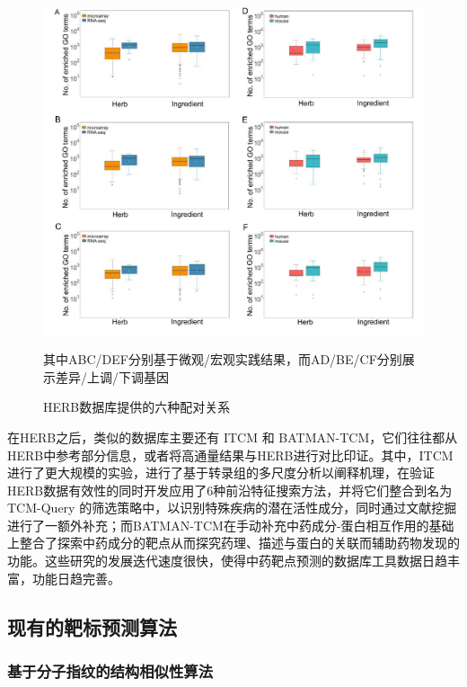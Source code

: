 \begin{figure}[H]
  \centering
  \includegraphics[width=\linewidth]{figures/HERB.png}
  \caption{HERB数据库提供的六种配对关系\cite{Fang_Dong_Liu_Guo_Zhao_Zhang_Bu_Liu_Huo_Cao_et_al._2021}}
  其中ABC/DEF分别基于微观/宏观实践结果，而AD/BE/CF分别展示差异/上调/下调基因
  \label{fig:HERB}
\end{figure}

在HERB之后，类似的数据库主要还有 ITCM 和 BATMAN-TCM，它们往往都从HERB中参考部分信息，或者将高通量结果与HERB进行对比印证。其中，ITCM进行了更大规模的实验，进行了基于转录组的多尺度分析以阐释机理，在验证HERB数据有效性的同时开发应用了6种前沿特征搜索方法，并将它们整合到名为 TCM-Query 的筛选策略中，以识别特殊疾病的潜在活性成分，同时通过文献挖掘进行了一额外补充\cite{Tian_Zhang_Yuan_Wang_Lv_Wang_Fang_Fu_Yang_Zu_et_al._2023}；而BATMAN-TCM在手动补充中药成分-蛋白相互作用的基础上整合了探索中药成分的靶点从而探究药理、描述与蛋白的关联而辅助药物发现的功能\cite{Kong_Liu_Zhang_Cheng_Mei_Li_Liu_Diao_Ma_Jiang_et_al._2024}。这些研究的发展迭代速度很快，使得中药靶点预测的数据库工具数据日趋丰富，功能日趋完善。

\subsection{现有的靶标预测算法}

\subsubsection{基于分子指纹的结构相似性算法}

